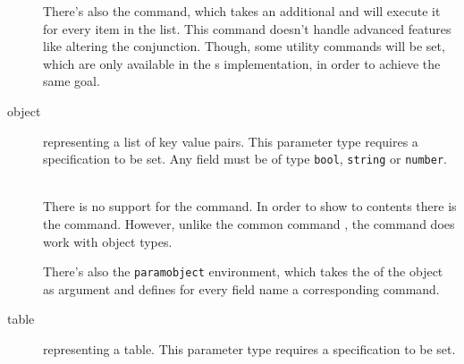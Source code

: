 \documentclass{ltxdoc}
\newcommand\showexample[5][15pt]{%
\begin{minipage}[t]{.5\linewidth - .5 \columnsep}%

\end{minipage}\hspace*{\columnsep}%
\begin{minipage}[t]{.5\linewidth - .5 \columnsep}%

\end{minipage}\\%
}
\begin{document}
\begin{description}
        \DescribeMacro{\forlistitem}
        There's also the \cmd{\forlistitem} command, which takes an additional  and will execute it for every item in the list.
        This command doesn't handle advanced features like altering the conjunction.
        Though, some utility commands will be set, which are only available in the s implementation, in order to achieve the same goal.
        \item[object] representing a list of key value pairs.
        This parameter type requires a  specification to be set.
        Any field must be of type \texttt{bool}, \texttt{string} or \texttt{number}.\\
        \showexample{16}{16-24}{7}{7-9}
        There is no support for the \cmd{\param} command.
        \DescribeMacro{\paramfield}
        In order to show to contents there is the \cmd{\paramfield} command.
        However, unlike the common command \cmd{\param}, the command \cmd{\hasparam} does work with object types.

         There's also the \texttt{paramobject} environment, which takes the  of the object as argument and defines for every field name a corresponding command.

        \item[table] representing a table.
        This parameter type requires a  specification to be set.\\
        \showexample[20pt]{25}{25}{10}{10}
    \end{description}

%    
%
%    
\end{document}
